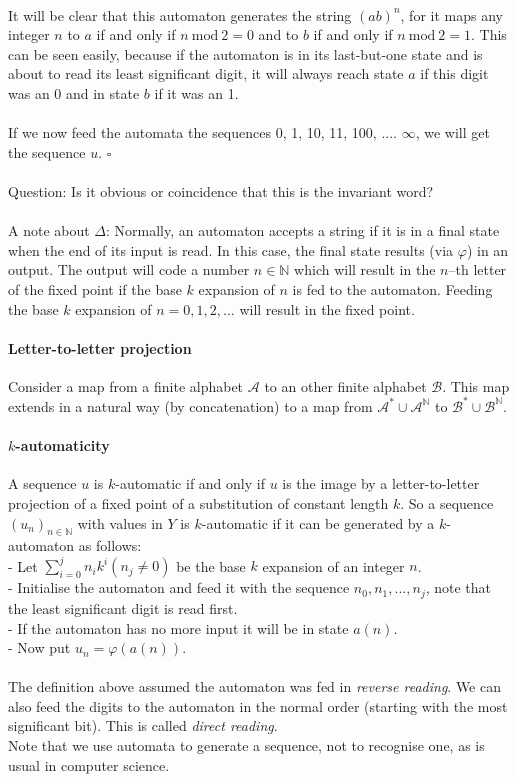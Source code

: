 \documentclass{article}
\begin{document}
\\
It will be clear that this automaton generates the string $(ab)^n$, for it
maps any integer $n$ to $a$ if and only if $n \mathrm{\ mod\ } 2 = 0$ and to
$b$ if and only if $n \mathrm{\ mod\ } 2 = 1$. This can be seen easily,
because if the automaton is in its last-but-one state and is about to read its
least significant digit, it will always reach state $a$ if this digit was an 0
and in state $b$ if it was an 1.\\
\\
If we now feed the automata the sequences 0, 1, 10, 11, 100, .... $\infty$,
we will get the sequence $u$. $\square$\\
\\
Question: Is it obvious or coincidence that this is the invariant word?\\
\\
A note about $\Delta$: Normally, an automaton accepts a string if it is in
a final state when the end of its input is read. In this case, the final state
results (via $\varphi$) in an output. The output will code a number
$n \in \mathbb{N}$ which will result in the $n$--th letter of the fixed point
if the base $k$ expansion of $n$ is fed to the automaton. Feeding the base
$k$ expansion of $n = 0, 1, 2, ...$ will result in the fixed point.

\paragraph{Letter-to-letter projection} Consider a map from a finite alphabet
$\mathcal{A}$ to an other finite alphabet $\mathcal{B}$. This map extends in
a natural way (by concatenation) to a map from
$\mathcal{A}^* \cup \mathcal{A}^\mathbb{N}$ to
$\mathcal{B}^* \cup \mathcal{B}^\mathbb{N}$.

\paragraph{$k$-automaticity} A sequence $u$ is $k$-automatic if and only if
$u$ is the image by a letter-to-letter projection of a fixed point of a
substitution of constant length $k$. So a sequence $(u_n)_{n \in \mathbb{N}}$
with values in $Y$ is $k$-automatic if it can be generated by a $k$-automaton
as follows:\\
- Let $\sum_{i=0}^j n_i k^i (n_j \neq 0)$ be the base $k$ expansion of an
  integer $n$.\\
- Initialise the automaton and feed it with the sequence $n_0, n_1, ..., n_j$,
  note that the least significant digit is read first.\\
- If the automaton has no more input it will be in state $a(n)$.\\
- Now put $u_n = \varphi(a(n))$.\\
\\
The definition above assumed the automaton was fed in \emph{reverse reading}.
We can also feed the digits to the automaton in the normal order (starting with
the most significant bit). This is called \emph{direct reading}.\\
Note that we use automata to generate a sequence, not to recognise one, as is
usual in computer science.
\end{document}
